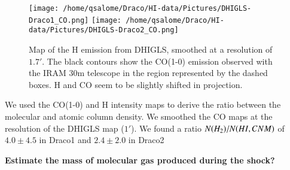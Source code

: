 \documentclass[traditabstract]{aa}
\begin{document}
\begin{figure*}[h!]
  \centering
  \texttt{[image: /home/qsalome/Draco/HI-data/Pictures/DHIGLS-Draco1\_CO.png]}
  \hspace{3mm}
  \texttt{[image: /home/qsalome/Draco/HI-data/Pictures/DHIGLS-Draco2\_CO.png]}
  \caption{\label{DRAO-CO} Map of the H emission from DHIGLS, smoothed at a resolution of $1.7'$. The black contours show the CO(1-0) emission observed with the IRAM 30m telescope in the region represented by the dashed boxes. H and CO seem to be slightly shifted in projection.}
\end{figure*}

   We used the CO(1-0) and H intensity maps to derive the ratio between the molecular and atomic column density. We smoothed the CO maps at the resolution of the DHIGLS map ($1'$). We found a ratio $N(H_2)/N(H\rmnum{1},CNM)$ of $4.0\pm 4.5$ in Draco1 and $2.4\pm 2.0$ in Draco2

\textbf{Estimate the mass of molecular gas produced during the shock?}


%

%
\end{document}
